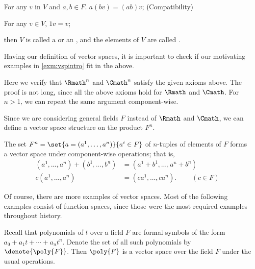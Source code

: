 \begin{example}
\begin{definition}
\begin{axioms}[Vsp]
        \item For any \(v\) in \(V\) and \(a,b\in F\).
        \(a(bv)=(ab)v\);
        \hfill\textsf{(Compatibility)}

        \item For any \(v\in V\), \(1v=v\);
    \end{axioms}
    then \(V\) is called
    a 
    or an ,
    and the elements of \(V\) are called
    .
\end{definition}

Having our definition of vector spaces,
it is important to check if
our motivating examples in \cref{exm:vspintro} fit in the above.

\begin{example}
    \label{exm:vsintroverif}
    Here we verify that
    \(\Rmath^n\) and \(\Cmath^n\) satisfy the given axioms above.
    The proof is not long,
    since all the above axioms hold for \(\Rmath\) and \(\Cmath\).
    For \(n>1\), we can repeat the same argument component-wise.
\end{example}

Since we are considering general fields \(F\)
instead of \(\Rmath\) and \(\Cmath\),
we can define a vector space structure on the product \(F^n\).

\begin{definition}
    \label{def:Fn}
    The set \(F^n=\set{a=(a^1,\dots,a^n)}{a^i\in F}\)
    of \(n\)-tuples of elements of \(F\)
    forms a vector space under component-wise operations;
    that is,
    \begin{align*}
        (a^1,\dots,a^n)+(b^1,\dots,b^n)
        &=(a^1+b^1,\dots,a^n+b^n) \\
        c(a^1,\dots,a^n)
        &=(ca^1,\dots,ca^n).
        \qquad\ (c\in F)
    \end{align*}
\end{definition}

Of course, there are more examples of vector spaces.
Most of the following examples consist of function spaces,
since those were the most required examples throughout history.

\begin{example}[Polynomials]
    \label{exm:vsppoly}
    Recall that polynomials of \(t\) over a field \(F\)
    are formal symbols of the form \(a_0+a_1t+\cdots+a_nt^n\).
    Denote the set of all such polynomials by \(\denote{\poly{F}}\).
    Then \(\poly{F}\) is a vector space over the field \(F\)
    under the usual operations.


\end{example}
\end{example}
